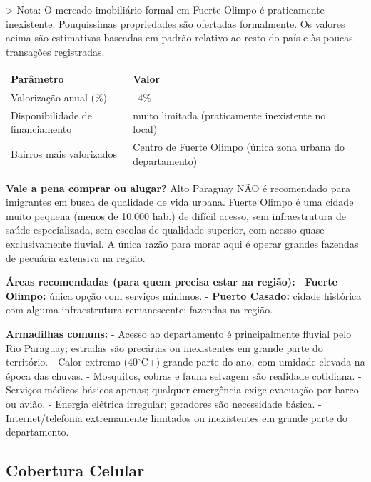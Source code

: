 > Nota: O mercado imobiliário formal em Fuerte Olimpo é praticamente inexistente. Pouquíssimas propriedades são ofertadas formalmente. Os valores acima são estimativas baseadas em padrão relativo ao resto do país e às poucas transações registradas.


{\small
\setlength{\tabcolsep}{3pt}
\renewcommand{\arraystretch}{1.12}
\begin{tabularx}{\linewidth}{>{\raggedright\arraybackslash}p{0.34\linewidth} >{\raggedright\arraybackslash}p{0.62\linewidth}}
\toprule
Parâmetro & Valor \\
\midrule
Valorização anual (\%) & 2--4\% \\
Disponibilidade de financiamento & muito limitada (praticamente inexistente no local) \\
Bairros mais valorizados & Centro de Fuerte Olimpo (única zona urbana do departamento) \\
\bottomrule
\end{tabularx}
}


\textbf{Vale a pena comprar ou alugar?}
Alto Paraguay NÃO é recomendado para imigrantes em busca de qualidade de vida urbana. Fuerte Olimpo é uma cidade muito pequena (menos de 10.000 hab.) de difícil acesso, sem infraestrutura de saúde especializada, sem escolas de qualidade superior, com acesso quase exclusivamente fluvial. A única razão para morar aqui é operar grandes fazendas de pecuária extensiva na região.

\textbf{Áreas recomendadas (para quem precisa estar na região):}
- \textbf{Fuerte Olimpo:} única opção com serviços mínimos.
- \textbf{Puerto Casado:} cidade histórica com alguma infraestrutura remanescente; fazendas na região.

\textbf{Armadilhas comuns:}
- Acesso ao departamento é principalmente fluvial pelo Rio Paraguay; estradas são precárias ou inexistentes em grande parte do território.
- Calor extremo (40$^\circ$C+) grande parte do ano, com umidade elevada na época das chuvas.
- Mosquitos, cobras e fauna selvagem são realidade cotidiana.
- Serviços médicos básicos apenas; qualquer emergência exige evacuação por barco ou avião.
- Energia elétrica irregular; geradores são necessidade básica.
- Internet/telefonia extremamente limitados ou inexistentes em grande parte do departamento.




\subsection{Cobertura Celular}



